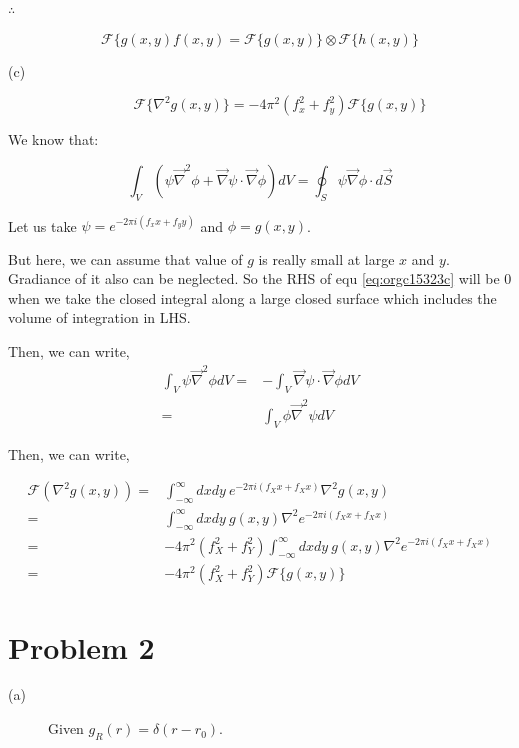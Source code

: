 \documentclass[a4paper,11pt]{article}
\begin{document}
\(\therefore\)

$$\mathcal{F}\{g(x,y)f(x,y) = \mathcal{F}\{g(x,y)\}\otimes \mathcal{F}\{h(x,y)\}$$

\begin{description}
\item[{(c)}] $$\mathcal{F}\{\nabla^2g(x,y)\}=-4\pi^2(f_x^2+f_y^2)\mathcal{F}\{g(x,y)\}$$
\end{description}

We know that:

\begin{equation}
\label{eq:orgc15323c}
\int_V\left(\psi\vec{\nabla}^2\phi+\vec{\nabla}\psi\cdot\vec{\nabla}\phi\right)dV=\oint_S\psi\vec{\nabla}\phi\cdot d\vec{S}
\end{equation}

Let us take \(\psi = e^{-2\pi i\left(f_xx+f_yy\right)}\) and \(\phi = g(x,y)\).

But here, we can assume that value of \(g\) is really small at large \(x\) and \(y\). Gradiance of it also can be neglected. So the RHS of equ \ref{eq:orgc15323c} will be 0 when we take the closed integral along a large closed surface which includes the volume of integration in LHS.

Then, we can write,
\begin{equation}
\label{eq:org277282e}
\begin{split}
\int_V\psi\vec{\nabla}^2\phi dV= & -\int_V\vec{\nabla}\psi\cdot\vec{\nabla}\phi dV \\
= & \int_V\phi\vec{\nabla}^2\psi dV 
\end{split}
\end{equation}

Then, we can write,

\begin{equation*}
\label{eq:orgf323a18}
\begin{split}
\mathcal{F}(\nabla^2g(x,y)) = & \int_{-\infty}^\infty dxdy~ e^{-2\pi i(f_Xx+f_Xx)}\nabla^2g(x,y) \\ = & \int_{-\infty}^\infty dxdy~ g(x,y)\nabla^2e^{-2\pi i(f_Xx+f_Xx)} \\ 
= & -4\pi^2(f_X^2+f_Y^2) \int_{-\infty}^\infty dxdy~ g(x,y)\nabla^2e^{-2\pi i(f_Xx+f_Xx)} \\
= & -4\pi^2(f_X^2+f_Y^2)\mathcal{F}\{g(x,y)\}
\end{split}
\end{equation*}

\newpage
\section*{Problem 2}
\label{sec:org396d2ab}
\begin{description}
\item[{(a)}] Given \(g_R(r)=\delta(r-r_0)\).
\end{description}
\end{document}
